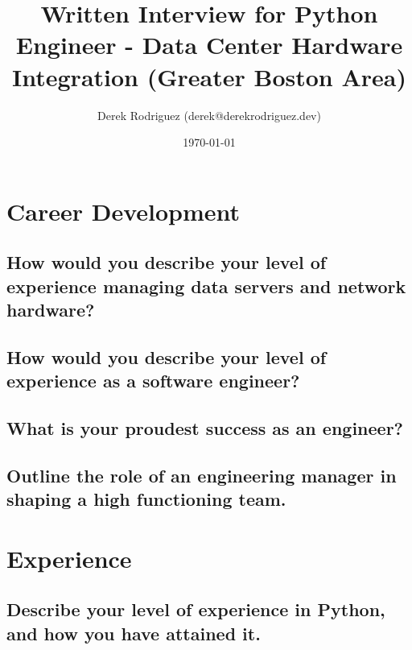 \documentclass{article}
\title{Written Interview for Python Engineer - Data Center Hardware Integration (Greater Boston Area)}
\author{Derek Rodriguez (derek@derekrodriguez.dev)}
\date{\today}
\begin{document}
\maketitle

\section{Career Development}
\subsection{How would you describe your level of experience managing data servers and network hardware?}
\subsection{How would you describe your level of experience as a software engineer?}
\subsection{What is your proudest success as an engineer?}
\subsection{Outline the role of an engineering manager in shaping a high functioning team.}

\section{Experience}
\subsection{Describe your level of experience in Python, and how you have attained it.}
\end{document}
